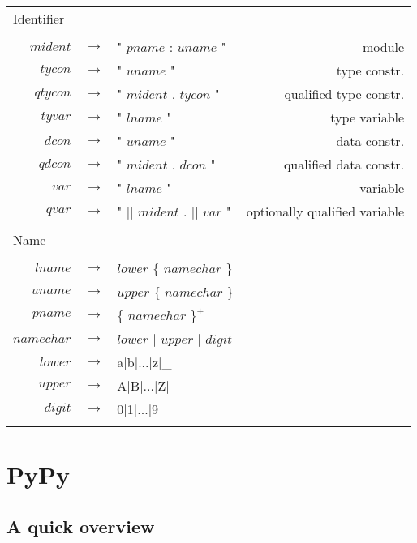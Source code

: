 \begin{footnotesize}
\begin{longtable}{ r c l r }
\multicolumn{4}{l}{Identifier}			 \\
\\[0.01in]
$mident$	& $ \rightarrow $	& " $pname$ : $uname$ "												& module		\\
$tycon$		& $ \rightarrow $	& " $uname$ "													& type constr.		\\
$qtycon$	& $ \rightarrow $	& " $mident$ . $tycon$ "											& qualified type constr.\\
$tyvar$		& $ \rightarrow $	& " $lname$ "													& type variable		\\
$dcon$		& $ \rightarrow $	& " $uname$ "													& data constr.		\\
$qdcon$		& $ \rightarrow $	& " $mident$ . $dcon$ "												& qualified data constr.\\
$var$		& $ \rightarrow $	& " $lname$ "													& variable		\\
$qvar$		& $ \rightarrow $	& " $||$ $mident$ . $||$ $var$ "										& optionally qualified variable\\
\\[0.01in]

\multicolumn{4}{l}{Name}			 \\
\\[0.01in]
$lname$		& $ \rightarrow $	& $lower$ $\{$ $namechar$ $\}$								& \\
$uname$		& $ \rightarrow $	& $upper$ $\{$ $namechar$ $\}$								& \\
$pname$		& $ \rightarrow $	& $\{$ $namechar$ $\}^{+}$								& \\
$namechar$	& $ \rightarrow $	& $lower$ $|$ $upper$ $|$ $digit$							& \\
$lower$		& $ \rightarrow $	& a$|$b$|$...$|$z$|$\_									& \\
$upper$		& $ \rightarrow $	& A$|$B$|$...$|$Z$|$									& \\
$digit$		& $ \rightarrow $	& 0$|$1$|$...$|$9									& \\
\\[0.01in]

\end{longtable}
\end{footnotesize}

\section{PyPy}

\subsection{A quick overview}

